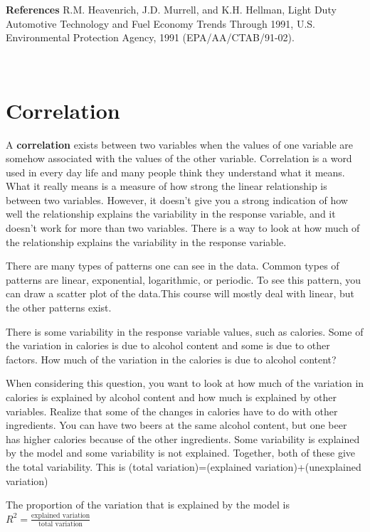 \documentclass[
]{book}
\begin{document}
\textbf{References}
R.M. Heavenrich, J.D. Murrell, and K.H. Hellman, Light Duty Automotive
Technology and Fuel Economy Trends Through 1991, U.S. Environmental Protection
Agency, 1991 (EPA/AA/CTAB/91-02).

\textbf{\\
}

\hypertarget{correlation}{%
\section{Correlation}\label{correlation}}

A \textbf{correlation} exists between two variables when the values of one variable are somehow associated with the values of the other variable. Correlation is a word used in every day life and many people think they understand what it means. What it really means is a measure of how strong the linear relationship is between two variables. However, it doesn't give you a strong indication of how well the relationship explains the variability in the response variable, and it doesn't work for more than two variables. There is a way to look at how much of the relationship explains the variability in the response variable.

There are many types of patterns one can see in the data. Common types of patterns are linear, exponential, logarithmic, or periodic. To see this pattern, you can draw a scatter plot of the data.This course will mostly deal with linear, but the other patterns exist.

There is some variability in the response variable values, such as calories. Some of the variation in calories is due to alcohol content and some is due to other factors. How much of the variation in the calories is due to alcohol content?

When considering this question, you want to look at how much of the variation in calories is explained by alcohol content and how much is explained by other variables. Realize that some of the changes in calories have to do with other ingredients. You can have two beers at the same alcohol content, but one beer has higher calories because of the other ingredients. Some variability is explained by the model and some variability is not explained. Together, both of these give the total variability. This is (total variation)=(explained variation)+(unexplained variation)

The proportion of the variation that is explained by the model is \(R^2=\frac{\text{explained variation}}{\text{total variation}}\)
\end{document}

